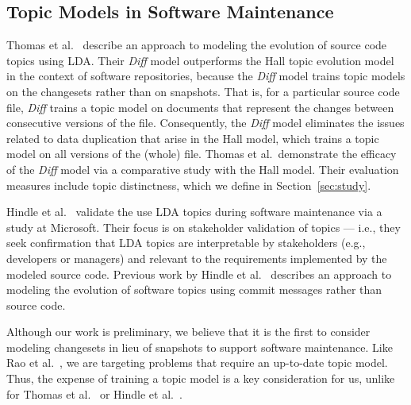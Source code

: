 \subsection{Topic Models in Software Maintenance}


Thomas et al.~\cite{Thomas-etal:2011} describe an approach to modeling the evolution of source code topics using LDA. Their \textit{Diff} model outperforms the Hall topic evolution model~\cite{Hall_etal:2008} in the context of software repositories, because the \textit{Diff} model trains topic models on the changesets rather than on snapshots. That is, for a particular source code file, \textit{Diff} trains a topic model on documents that represent the changes between consecutive versions of the file. Consequently, the \textit{Diff} model eliminates the issues related to data duplication that arise in the Hall model, which trains a topic model on all versions of the (whole) file. Thomas et al.\ demonstrate the efficacy of the \textit{Diff} model via a comparative study with the Hall model. Their evaluation measures include topic distinctness, which we define in Section~\ref{sec:study}.

Hindle et al.~\cite{Hindle_etal:2012} validate the use LDA topics during software maintenance via a study at Microsoft. Their focus is on stakeholder validation of topics --- i.e., they seek confirmation that LDA topics are interpretable by stakeholders (e.g., developers or managers) and relevant to the requirements implemented by the modeled source code. Previous work by Hindle et al.~\cite{Hindle-etal:2009} describes an approach to modeling the evolution of software topics using commit messages rather than source code.

Although our work is preliminary, we believe that it is the first to consider modeling changesets in lieu of snapshots to support software maintenance. Like Rao et al.~\cite{Rao-etal:2011}, we are targeting problems that require an up-to-date topic model. Thus, the expense of training a topic model is a key consideration for us, unlike for Thomas et al.~\cite{Thomas-etal:2011} or Hindle et al.~\cite{Hindle-etal:2009,Hindle_etal:2012}.

